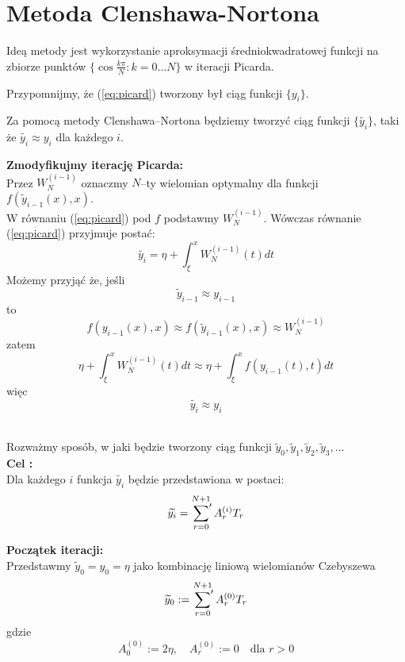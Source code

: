 \documentclass{article}
\newcommand{\sumprim}[3] {
	\sideset{}{'}\sum_{#1}^{#2} #3
}
\begin{document}
\section{Metoda Clenshawa-Nortona}
Ideą metody jest wykorzystanie aproksymacji średniokwadratowej funkcji na zbiorze punktów 
$  \{ \cos{ \frac{k \pi}{N} }  : k = 0 \ldots N \}$  w iteracji Picarda. 

\par 
	Przypomnijmy, że (\ref{eq:picard}) tworzony był ciąg funkcji $\{ y_i \}$.
	
	Za pomocą metody Clenshawa--Nortona będziemy tworzyć ciąg funkcji $\{ \widetilde{y_i} \}$, taki że $\widetilde {y_i} \approx y_i $ dla każdego $i$.
	
	\textbf{Zmodyfikujmy iterację Picarda:} \\
	Przez $W_{N}^{(i-1)}$ oznaczmy $N$--ty wielomian optymalny dla funkcji $f(\widetilde{y}_{i-1}(x), x)$. \\
	W równaniu (\ref{eq:picard}) pod $f$ podstawmy $W_{N}^{(i-1)}$. Wówczas równanie (\ref{eq:picard}) przyjmuje postać:
	\begin{equation} 
		\label{eq:picapprox}
		\widetilde{y_i} = \eta + \int_{\xi}^{x} W_{N}^{(i-1)}(t) dt
	\end{equation}
	Możemy przyjąć że, jeśli
	$$ \widetilde{y}_{i-1} \approx y_{i-1}$$
	to
	$$ f(y_{i-1}(x), x) \approx f( \widetilde{y}_{i-1}(x), x) \approx W_{N}^{(i-1)}$$
	zatem
	$$ \eta + \int_{\xi}^{x} W_{N}^{(i-1)}(t) dt \approx \eta + \int_{\xi}^{x} f(y_{i-1}(t), t) dt $$
	więc
	$$ \widetilde{y_i} \approx y_i$$
	~


\par Rozważmy sposób, w jaki będzie tworzony ciąg funkcji $\widetilde{y}_0, \widetilde{y}_1, \widetilde{y}_2 , \widetilde{y}_3, \ldots $ \\

\textbf{Cel :} \\
Dla każdego $i$ funkcja $\widetilde{y_i}$ będzie przedstawiona w postaci:
\begin{equation}
	\label{eq:iterform}
	\widetilde{y_i} = \sumprim{r=0}{N+1}{ A_r^{(i)} T_r }
\end{equation}
		
\textbf{Początek iteracji:} \\
	Przedstawmy $\widetilde{y}_0 = y_0 = \eta$ jako kombinację liniową wielomianów Czebyszewa 
	$$ \widetilde{y}_{0} := \sumprim{r=0}{N+1}{A_r^{(0)} T_r}$$
	gdzie
	$$ A_0^{(0)} := 2 \eta ,\quad A_r^{(0)} := 0 \quad \text{dla $r > 0$}$$
\end{document}
